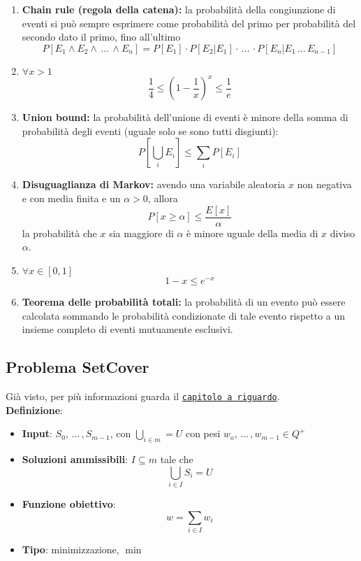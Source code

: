 \begin{enumerate}
	\item \textbf{Chain rule (regola della catena):} la probabilità della congiunzione di eventi si può sempre esprimere come probabilità del primo per probabilità del secondo dato il primo, fino all'ultimo
	$$ P[E_1 \wedge E_2 \wedge \, \dots \, \wedge E_n] = P [E_1] \cdot P [E_2 | E_1] \cdot \, \dots \, \cdot P[E_n | E_1 \, \dots \, E_{n-1}] $$
	
	\item $\forall x > 1$
	$$ \frac{1}{4} \leq \left(1 - \frac{1}{x}\right)^x \leq \frac{1}{e} $$
	
	\item \textbf{Union bound:} la probabilità dell'unione di eventi è minore della somma di probabilità degli eventi (uguale solo se sono tutti disgiunti):
	$$ P\left[ \bigcup_i E_i \right] \leq \sum_i P[E_i] $$
	
	\item \textbf{Disuguaglianza di Markov:} avendo una variabile aleatoria $x$ non negativa e con media finita e un $\alpha > 0$, allora
	$$ P[x \geq \alpha] \leq \frac{E[x]}{\alpha} $$
	la probabilità che $x$ sia maggiore di $\alpha$ è minore uguale della media di $x$ diviso $\alpha$.
	
	\item $\forall x \in [0,1]$
	$$ 1 - x \leq e^{-x} $$
	
	\item \textbf{Teorema delle probabilità totali:} la probabilità di un evento può essere calcolata sommando le probabilità condizionate di tale evento rispetto a un insieme completo di eventi mutuamente esclusivi.\\
\end{enumerate}

\newpage

\subsection{Problema SetCover}

Già visto, per più informazioni guarda il \hyperref[subsec:setcover]{\texttt{capitolo a riguardo}}.\\

\textbf{Definizione}:
\begin{itemize}
	\item \textbf{Input}: $S_0, \, \dots \, , S_{m-1}$, con $\bigcup_{i \in m} = U$ con pesi $w_o, \, \dots \, , w_{m-1} \in Q^+$
	
	\item \textbf{Soluzioni ammissibili}: $I \subseteq m$ tale che
	$$ \bigcup_{i \in I} S_i = U $$
	
	\item \textbf{Funzione obiettivo}: 
	$$ w = \sum_{i \in I} w_i $$
	
	\item \textbf{Tipo}: minimizzazione, $\min$
\end{itemize} 

